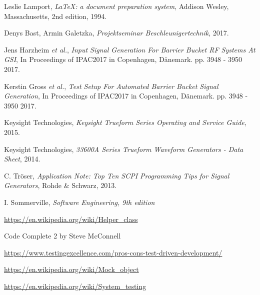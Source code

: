 \documentclass[../Report.tex]{subfiles}
\begin{document}


\begin{thebibliography}{9}

  Leslie Lamport,
  \textit{\LaTeX: a document preparation system},
  Addison Wesley, Massachusetts,
  2nd edition,
  1994.
  
	Denys Bast, Armin Galetzka, 
	\textit{Projektseminar Beschleunigertechnik},
	2017.
 
	Jens Harzheim \textit{et al.}, 
	\textit{Input Signal Generation For Barrier Bucket RF Systems At GSI}, In Proceedings of IPAC2017 in Copenhagen, Dänemark. 
	pp. 3948 - 3950
	2017.
	
	Kerstin Gross \textit{et al.},
	\textit{Test Setup For Automated Barrier Bucket Signal Generation},
	In Proceedings of IPAC2017 in Copenhagen, Dänemark. 
	pp. 3948 - 3950
	2017.
	
	Keysight Technologies,
	\textit{Keysight Trueform Series Operating and Service Guide},
	2015.

	Keysight Technologies,
	\textit{33600A Series Trueform Waveform Generators - Data Sheet},
	2014.
	
	C. Tröser, 
	\textit{Application Note: Top Ten SCPI Programming Tips for Signal Generators},
	Rohde \& Schwarz,
	2013.
	
	I. Sommerville,
	\textit{Software Engineering, 9th edition}
	
	\url{https://en.wikipedia.org/wiki/Helper_class}
	
	Code Complete 2 by Steve McConnell
	
	\url{https://www.testingexcellence.com/pros-cons-test-driven-development/}
	
	\url{https://en.wikipedia.org/wiki/Mock_object}
	
	\url{https://en.wikipedia.org/wiki/System_testing}	

\end{thebibliography}
\end{document}

